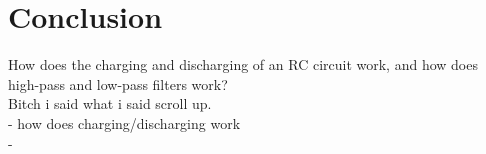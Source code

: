 \chapter{Conclusion}
How does the charging and discharging of an RC circuit work, and how does high-pass and low-pass filters work? \\
Bitch i said what i said scroll up. \\
- how does charging/discharging work \\
- 